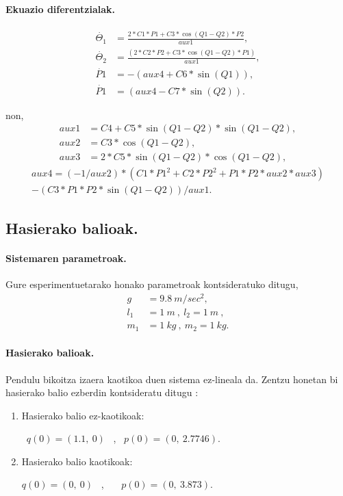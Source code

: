 \paragraph*{\textbf{Ekuazio diferentzialak.}}

\begin{align*}
\dot{\Theta_1} & = \frac {2*C1*P1+C3*\cos(Q1-Q2)*P2}{aux1},\\
\dot{\Theta_2} & = \frac{(2*C2*P2+C3*\cos(Q1-Q2)*P1)}{aux1},\\
\dot{P1} &=-(aux4+C6*\sin(Q1)), \\
\dot{P1} &=(aux4-C7*\sin(Q2)).
\end{align*}

non,
\begin{align*}
aux1 &=C4+C5*\sin(Q1-Q2)*\sin(Q1-Q2), \\
aux2 &=C3*\cos(Q1-Q2),\\
aux3 &=2*C5*\sin(Q1-Q2)*\cos(Q1-Q2),
\end{align*}
\begin{multline*}
aux4 =(-1/aux2)*(C1*P1^2+C2*P2^2+P1*P2*aux2*aux3)\\
       -(C3*P1*P2*\sin(Q1-Q2))/{aux1}. 
\end{multline*}

\subsection{Hasierako balioak.}

\paragraph*{\textbf{Sistemaren parametroak}.} 
Gure esperimentuetarako honako parametroak kontsideratuko ditugu,
\begin{align*} 
\label{eq:17}
g & =9.8 \ m/sec^2,\\
l_1 & =1 \ m \ , \ l_2=1 \ m\ ,\\
m_1 & =1 \ kg\ , \ m_2=1 \ kg.
\end{align*} 

\paragraph*{\textbf{Hasierako balioak}.}
Pendulu bikoitza izaera kaotikoa duen sistema ez-lineala da. Zentzu honetan bi hasierako balio ezberdin kontsideratu ditugu \cite{Papadrakakis}:

\begin{enumerate}
   \item Hasierako balio ez-kaotikoak: 
     
   \ $q(0)=(1.1, \ 0)$ \ , \ $p(0)=(0,\ 2.7746)$.    
   \item Hasierako balio kaotikoak: 
      
   $q(0)=(0, \ 0)$ \ , \ \ \  $p(0)=(0,\ 3.873)$.
\end{enumerate}


